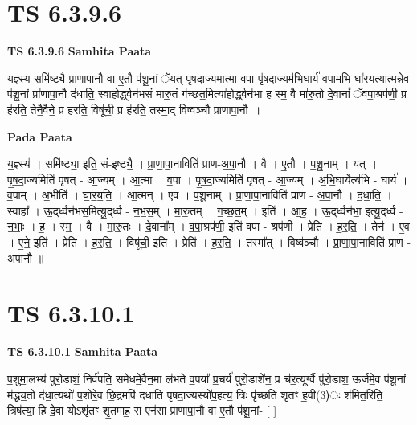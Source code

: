 \documentclass[17pt]{extarticle}
\begin{document}
\section*{ TS 6.3.9.6 }

\textbf{TS 6.3.9.6 } \newline
\textbf{Samhita Paata} \newline

य॒ज्ञ्स्य॒ समि॑ष्ट्यै प्राणापा॒नौ वा ए॒तौ प॑शू॒नां ॅयत् पृ॑षदा॒ज्यमा॒त्मा व॒पा पृ॑षदा॒ज्यम॑भि॒घार्य॑ व॒पाम॒भि घा॑रयत्या॒त्मन्ने॒व प॑शू॒नां प्रा॑णापा॒नौ द॑धाति॒ स्वाहो॒र्द्ध्वन॑भसं मारु॒तं ग॑च्छत॒मित्या॑हो॒र्द्ध्वन॑भा ह स्म॒ वै मा॑रु॒तो दे॒वानां᳚ ॅवपा॒श्रप॑णी॒ प्र ह॑रति॒ तेनै॒वैने॒ प्र ह॑रति॒ विषू॑ची॒ प्र ह॑रति॒ तस्मा॒द् विष्व॑ञ्चौ प्राणापा॒नौ ॥ \newline

\textbf{Pada Paata} \newline

य॒ज्ञ्स्य॑ । समि॑ष्ट्या॒ इति॒ सं-इ॒ष्ट्यै॒ । प्रा॒णा॒पा॒नाविति॑ प्राण-अ॒पा॒नौ । वै । ए॒तौ । प॒शू॒नाम् । यत् । पृ॒ष॒दा॒ज्यमिति॑ पृषत् - आ॒ज्यम् । आ॒त्मा । व॒पा । पृ॒ष॒दा॒ज्यमिति॑ पृषत् - आ॒ज्यम् । अ॒भि॒घार्येत्य॑भि - घार्य॑ । व॒पाम् । अ॒भीति॑ । घा॒र॒य॒ति॒ । आ॒त्मन् । ए॒व । प॒शू॒नाम् । प्रा॒णा॒पा॒नाविति॑ प्राण - अ॒पा॒नौ । द॒धा॒ति॒ । स्वाहा᳚ । ऊ॒द्‌र्ध्वन॑भस॒मित्यू॒द्‌र्ध्व - न॒भ॒स॒म् । मा॒रु॒तम् । ग॒च्छ॒त॒म् । इति॑ । आ॒ह॒ । ऊ॒द्‌र्ध्वन॑भा॒ इत्यू॒द्‌र्ध्व - न॒भाः॒ । ह॒ । स्म॒ । वै । मा॒रु॒तः । दे॒वाना᳚म् । व॒पा॒श्रप॑णी॒ इति॑ वपा - श्रप॑णी । प्रेति॑ । ह॒र॒ति॒ । तेन॑ । ए॒व । ए॒ने॒ इति॑ । प्रेति॑ । ह॒र॒ति॒ । विषू॑ची॒ इति॑ । प्रेति॑ । ह॒र॒ति॒ । तस्मा᳚त् । विष्व॑ञ्चौ । प्रा॒णा॒पा॒नाविति॑ प्राण - अ॒पा॒नौ ॥  \newline




\section*{ TS 6.3.10.1 }

\textbf{TS 6.3.10.1 } \newline
\textbf{Samhita Paata} \newline

प॒शुमा॒लभ्य॑ पुरो॒डाशं॒ निर्व॑पति॒ समे॑धमे॒वैन॒मा ल॑भते व॒पया᳚ प्र॒चर्य॑ पुरो॒डाशे॑न॒ प्र च॑र॒त्यूर्ग्वै पु॑रो॒डाश॒ ऊर्ज॑मे॒व प॑शू॒नां म॑द्ध्य॒तो द॑धा॒त्यथो॑ प॒शोरे॒व छि॒द्रमपि॑ दधाति पृषदा॒ज्यस्यो॑प॒हत्य॒ त्रिः पृ॑च्छति शृ॒तꣳ ह॒वी(3)ः श॑मित॒रिति॒ त्रिष॑त्या॒ हि दे॒वा योऽशृ॑तꣳ शृ॒तमाह॒ स एन॑सा प्राणापा॒नौ वा ए॒तौ प॑शू॒नां- [  ] \newline
\end{document}
